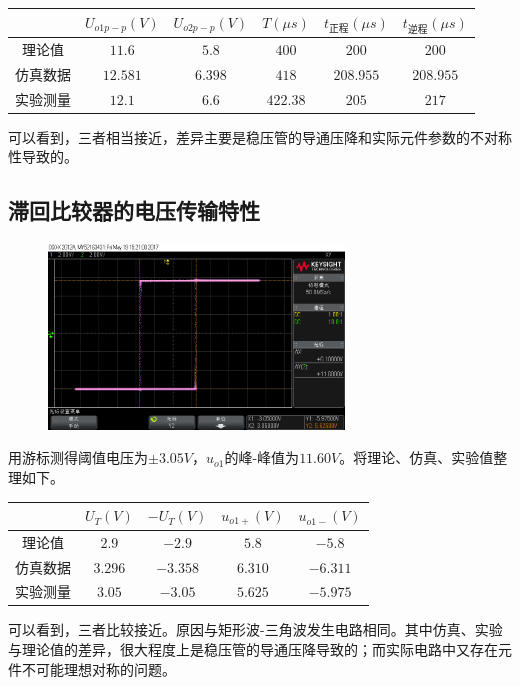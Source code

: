 \documentclass[12pt,a4paper]{article}
\begin{document}
\begin{spacing}{1.3}
\begin{table} [H]
\centering
\begin{tabular}{|c|c|c|c|c|c|}
\hline 
&$U_{o1p-p}(V)$ &$U_{o2p-p}(V)$ &$ T(\mu s)$ &$t_{正程}(\mu s)$ &$t_{逆程}(\mu s)$\\ \hline 
理论值 &$11.6$ &$5.8$ &$400$ &$ 200$ &$200$ \\ \hline
仿真数据&$12.581$& $6.398$ &$418$ & $208.955$ &$208.955$\\ \hline 
实验测量&$12.1$ & $6.6$ & $422.38$ &$205$ &$217$ \\ \hline
\end{tabular} 
\end{table}
可以看到，三者相当接近，差异主要是稳压管的导通压降和实际元件参数的不对称性导致的。
\subsection{滞回比较器的电压传输特性}
\begin{figure}[H]
\centering
\includegraphics[width=0.7\textwidth]{scope_7.png}
\end{figure}
用游标测得阈值电压为$\pm 3.05V$，$u_{o1}$的峰-峰值为$11.60V$。将理论、仿真、实验值整理如下。
\begin{table}[H]
\centering
\begin{tabular}{|c|c|c|c|c|}
\hline 
&$U_T(V)$ &$-U_T(V)$& $u_{o1+}(V)$ &$u_{o1-}(V)$\\ \hline 
理论值 &$2.9$ &$-2.9$ &$5.8$ &$-5.8$ \\ \hline
仿真数据&$3.296$& $-3.358$ &  $6.310$& $-6.311$\\ \hline 
实验测量&$3.05$ & $-3.05$ & $5.625$ &$-5.975$ \\ \hline
\end{tabular} 
\end{table}
可以看到，三者比较接近。原因与矩形波-三角波发生电路相同。其中仿真、实验与理论值的差异，很大程度上是稳压管的导通压降导致的；而实际电路中又存在元件不可能理想对称的问题。

\end{spacing}
\end{document}
